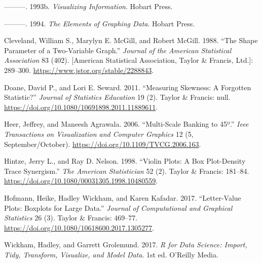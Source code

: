 \documentclass[]{book}
\theoremstyle{plain}
\theoremstyle{remark}
\begin{document}
\leavevmode\hypertarget{ref-Cleveland1993}{}%
---------. 1993b. \emph{Visualizing Information}. Hobart Press.

\leavevmode\hypertarget{ref-Cleveland1994}{}%
---------. 1994. \emph{The Elements of Graphing Data}. Hobart Press.

\leavevmode\hypertarget{ref-ClevelandMcGillMcGill1988}{}%
Cleveland, William S., Marylyn E. McGill, and Robert McGill. 1988. ``The Shape Parameter of a Two-Variable Graph.'' \emph{Journal of the American Statistical Association} 83 (402). {[}American Statistical Association, Taylor \& Francis, Ltd.{]}: 289--300. \url{https://www.jstor.org/stable/2288843}.

\leavevmode\hypertarget{ref-DoaneSeward2011}{}%
Doane, David P., and Lori E. Seward. 2011. ``Measuring Skewness: A Forgotten Statistic?'' \emph{Journal of Statistics Education} 19 (2). Taylor \& Francis: null. \url{https://doi.org/10.1080/10691898.2011.11889611}.

\leavevmode\hypertarget{ref-HeerAgrawala2006}{}%
Heer, Jeffrey, and Maneesh Agrawala. 2006. ``Multi-Scale Banking to 45º.'' \emph{Ieee Transactions on Visualization and Computer Graphics} 12 (5, September/October). \url{https://doi.org/10.1109/TVCG.2006.163}.

\leavevmode\hypertarget{ref-HintzeNelson1998}{}%
Hintze, Jerry L., and Ray D. Nelson. 1998. ``Violin Plots: A Box Plot-Density Trace Synergism.'' \emph{The American Statistician} 52 (2). Taylor \& Francis: 181--84. \url{https://doi.org/10.1080/00031305.1998.10480559}.

\leavevmode\hypertarget{ref-HofmannWickhamKafadar2017}{}%
Hofmann, Heike, Hadley Wickham, and Karen Kafadar. 2017. ``Letter-Value Plots: Boxplots for Large Data.'' \emph{Journal of Computational and Graphical Statistics} 26 (3). Taylor \& Francis: 469--77. \url{https://doi.org/10.1080/10618600.2017.1305277}.

\leavevmode\hypertarget{ref-WickhamGrolemund2017}{}%
Wickham, Hadley, and Garrett Grolemund. 2017. \emph{R for Data Science: Import, Tidy, Transform, Visualize, and Model Data}. 1st ed. O'Reilly Media.
\end{document}
